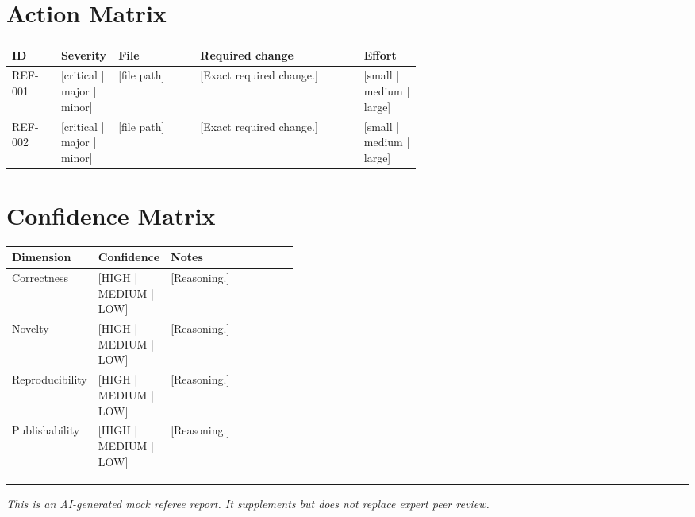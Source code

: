\documentclass[11pt]{article}
\begin{document}
\section*{Action Matrix}

\begin{tabularx}{\linewidth}{@{}p{0.12\linewidth}p{0.14\linewidth}p{0.20\linewidth}Y p{0.14\linewidth}@{}}
\toprule
\textbf{ID} & \textbf{Severity} & \textbf{File} & \textbf{Required change} & \textbf{Effort} \\
\midrule
REF-001 & [critical | major | minor] & [file path] & [Exact required change.] & [small | medium | large] \\
REF-002 & [critical | major | minor] & [file path] & [Exact required change.] & [small | medium | large] \\
\bottomrule
\end{tabularx}

\section*{Confidence Matrix}

\begin{tabularx}{\linewidth}{@{}p{0.26\linewidth}p{0.16\linewidth}Y@{}}
\toprule
\textbf{Dimension} & \textbf{Confidence} & \textbf{Notes} \\
\midrule
Correctness & [HIGH | MEDIUM | LOW] & [Reasoning.] \\
Novelty & [HIGH | MEDIUM | LOW] & [Reasoning.] \\
Reproducibility & [HIGH | MEDIUM | LOW] & [Reasoning.] \\
Publishability & [HIGH | MEDIUM | LOW] & [Reasoning.] \\
\bottomrule
\end{tabularx}


\vfill

{\color{ReportCrimson}\rule{\linewidth}{1.1pt}}

\small
\textit{This is an AI-generated mock referee report. It supplements but does not replace expert peer review.}
\end{document}
